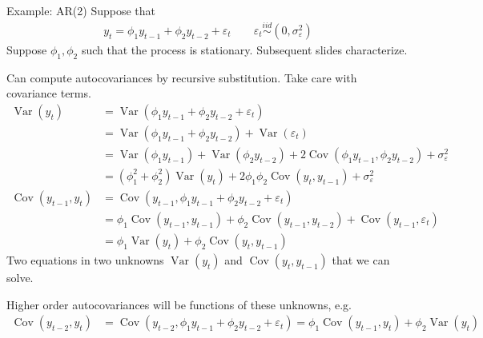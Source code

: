 \documentclass[aspectratio=169, handout]{beamer}
\newcommand{\iid}{\overset{iid}{\sim}}
\newcommand{\Cov}{\operatorname{Cov}}
\newcommand{\Var}{\operatorname{Var}}
\begin{document}
{\scriptsize
\begin{frame}{Example: AR(2)}
Suppose that
\begin{align*}
  y_t = \phi_1 y_{t-1} + \phi_2 y_{t-2} + \varepsilon_t
  \qquad
  \varepsilon_t\iid (0,\sigma^2_\varepsilon)
\end{align*}
Suppose $\phi_1,\phi_2$ such that the process is stationary.
Subsequent slides characterize.

Can compute autocovariances by recursive substitution.
Take care with covariance terms.
\begin{align*}
  \Var(y_t)
  &= \Var(\phi_1 y_{t-1} + \phi_2 y_{t-2} + \varepsilon_t)
  \\
  &=
  \Var(\phi_1 y_{t-1} + \phi_2 y_{t-2}) + \Var(\varepsilon_t)
  \\
  &=
  \Var(\phi_1 y_{t-1})
  +
  \Var(\phi_2 y_{t-2})
  +
  2\Cov(\phi_1 y_{t-1}, \phi_2 y_{t-2})
  + \sigma^2_\varepsilon
  \\
  &=
  (\phi_1^2 + \phi_2^2) \Var(y_{t})
  + 2\phi_1\phi_2  \Cov(y_{t}, y_{t-1})
  + \sigma^2_\varepsilon
  \\
  \Cov(y_{t-1},y_t)
  &=
  \Cov(y_{t-1},\phi_1 y_{t-1} + \phi_2 y_{t-2} + \varepsilon_t)
  \\
  &=
  \phi_1 \Cov(y_{t-1},y_{t-1})
  +
  \phi_2 \Cov(y_{t-1},y_{t-2})
  +
  \Cov(y_{t-1},\varepsilon_t)
  \\
  &=
  \phi_1 \Var(y_{t})
  +
  \phi_2 \Cov(y_{t},y_{t-1})
\end{align*}
Two equations in two unknowns $\Var(y_t)$ and $\Cov(y_t,y_{t-1})$ that
we can solve.

Higher order autocovariances will be functions of these unknowns, e.g.
\begin{align*}
  \Cov(y_{t-2},y_t)
  &=
  \Cov(y_{t-2},\phi_1 y_{t-1} + \phi_2 y_{t-2} + \varepsilon_t)
  =
  \phi_1 \Cov(y_{t-1},y_{t})
  +
  \phi_2 \Var(y_{t})
\end{align*}

\end{frame}
}
\end{document}

